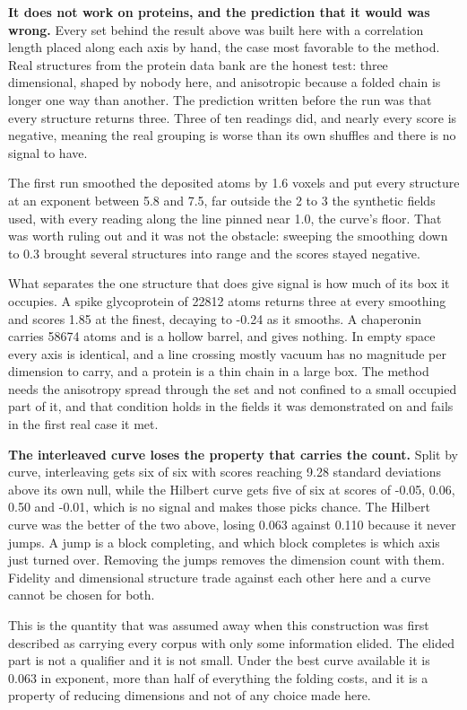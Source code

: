 \textbf{It does not work on proteins, and the prediction that it would was wrong.} Every set behind the result above was built here with a correlation length placed along each axis by hand, the case most favorable to the method. Real structures from the protein data bank are the honest test: three dimensional, shaped by nobody here, and anisotropic because a folded chain is longer one way than another. The prediction written before the run was that every structure returns three. Three of ten readings did, and nearly every score is negative, meaning the real grouping is worse than its own shuffles and there is no signal to have.

The first run smoothed the deposited atoms by 1.6 voxels and put every structure at an exponent between 5.8 and 7.5, far outside the 2 to 3 the synthetic fields used, with every reading along the line pinned near 1.0, the curve's floor. That was worth ruling out and it was not the obstacle: sweeping the smoothing down to 0.3 brought several structures into range and the scores stayed negative.

What separates the one structure that does give signal is how much of its box it occupies. A spike glycoprotein of 22812 atoms returns three at every smoothing and scores 1.85 at the finest, decaying to -0.24 as it smooths. A chaperonin carries 58674 atoms and is a hollow barrel, and gives nothing. In empty space every axis is identical, and a line crossing mostly vacuum has no magnitude per dimension to carry, and a protein is a thin chain in a large box. The method needs the anisotropy spread through the set and not confined to a small occupied part of it, and that condition holds in the fields it was demonstrated on and fails in the first real case it met.

\textbf{The interleaved curve loses the property that carries the count.} Split by curve, interleaving gets six of six with scores reaching 9.28 standard deviations above its own null, while the Hilbert curve gets five of six at scores of -0.05, 0.06, 0.50 and -0.01, which is no signal and makes those picks chance. The Hilbert curve was the better of the two above, losing 0.063 against 0.110 because it never jumps. A jump is a block completing, and which block completes is which axis just turned over. Removing the jumps removes the dimension count with them. Fidelity and dimensional structure trade against each other here and a curve cannot be chosen for both.

This is the quantity that was assumed away when this construction was first described as carrying every corpus with only some information elided. The elided part is not a qualifier and it is not small. Under the best curve available it is 0.063 in exponent, more than half of everything the folding costs, and it is a property of reducing dimensions and not of any choice made here.

